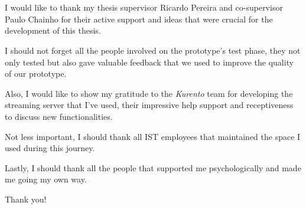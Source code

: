 \chapter*{\acknowledgments}


I would like to thank my thesis supervisor Ricardo Pereira and co-supervisor Paulo Chainho for their active support and ideas that were crucial for the development of this thesis.

I should not forget all the people involved on the prototype's test phase, they not only tested but also gave valuable feedback that we used to improve the quality of our prototype. 

Also, I would like to show my gratitude to the \emph{Kurento} team for developing the streaming server that I've used, their impressive help support and receptiveness to discuss new functionalities.   

Not less important, I should thank all IST employees that maintained the space I used during this journey.

Lastly, I should thank all the people that supported me psychologically and made me going my own way. 

Thank you!

\cleardoublepage